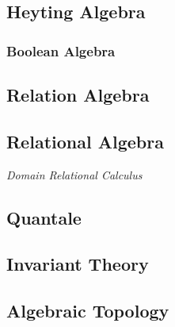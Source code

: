 \subsection{Heyting Algebra}\label{subsec:heyting_algebra}

\subsubsection{Boolean Algebra}\label{subsec:boolean_algebra}

\subsection{Relation Algebra}
\subsection{Relational Algebra}
\emph{Domain Relational Calculus}
\subsection{Quantale}



\subsection{Invariant Theory}\label{subsec:invariant_theory}



\subsection{Algebraic Topology}\label{subsec:algebraic_topology}




